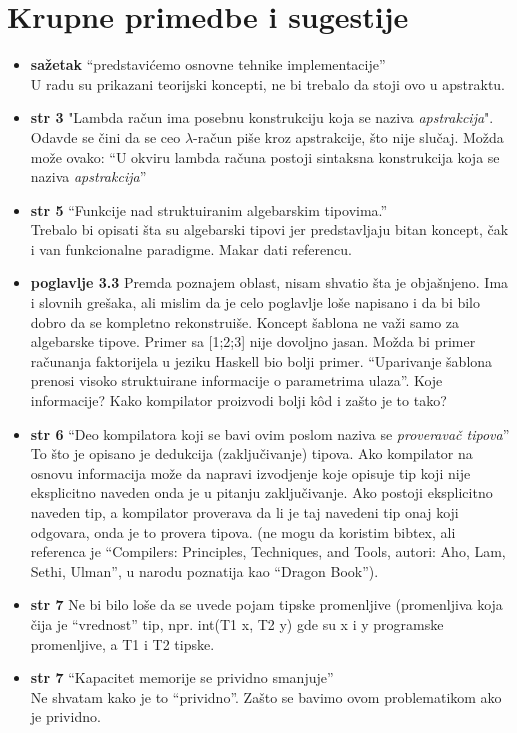 \documentclass[a4paper]{report}
\begin{document}
\section{Krupne primedbe i sugestije}
\begin{itemize}
\item \textbf{sažetak} ``predstavićemo osnovne tehnike implementacije'' \\ U radu su prikazani teorijski koncepti, ne bi trebalo da stoji ovo u apstraktu.
\item \textbf{str 3} "Lambda račun ima posebnu konstrukciju koja se naziva \textit{apstrakcija}".\\Odavde se čini da se ceo $\lambda$-račun piše kroz apstrakcije, što nije slučaj. Možda može ovako: ``U okviru lambda računa postoji sintaksna konstrukcija koja se naziva \textit{apstrakcija}''
\item \textbf{str 5} ``Funkcije nad struktuiranim algebarskim tipovima.'' \\ Trebalo bi opisati šta su algebarski tipovi jer predstavljaju bitan koncept, čak i van funkcionalne paradigme. Makar dati referencu.
\item \textbf{poglavlje 3.3} Premda poznajem oblast, nisam shvatio šta je objašnjeno. Ima i slovnih grešaka, ali mislim da je celo poglavlje loše napisano i da bi bilo dobro da se kompletno rekonstruiše. Koncept šablona ne važi samo za algebarske tipove. Primer sa [1;2;3] nije dovoljno jasan. Možda bi primer računanja faktorijela u jeziku Haskell bio bolji primer. ``Uparivanje šablona prenosi visoko struktuirane informacije o parametrima ulaza''. Koje informacije? Kako kompilator proizvodi bolji kôd i zašto je to tako?
\item \textbf{str 6} ``Deo kompilatora koji se bavi ovim poslom naziva se \textit{proveravač tipova}'' \\ To što je opisano je dedukcija (zaključivanje) tipova. Ako kompilator na osnovu informacija može da napravi izvodjenje koje opisuje tip koji nije eksplicitno naveden onda je u pitanju zaključivanje. Ako postoji eksplicitno naveden tip, a kompilator proverava da li je taj navedeni tip onaj koji odgovara, onda je to provera tipova. (ne mogu da koristim bibtex, ali referenca je ``Compilers: Principles, Techniques, and Tools, autori: Aho, Lam, Sethi, Ulman'', u narodu poznatija kao ``Dragon Book'').
\item \textbf{str 7} Ne bi bilo loše da se uvede pojam tipske promenljive (promenljiva koja čija je ``vrednost'' tip, npr. int(T1 x, T2 y) gde su x i y programske promenljive, a T1 i T2 tipske.
\item \textbf{str 7} ``Kapacitet memorije se prividno smanjuje'' \\ Ne shvatam kako je to ``prividno''. Zašto se bavimo ovom problematikom ako je prividno. 


\end{itemize}
\end{document}
